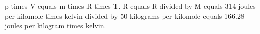 p times V equals m times R times T.  
R equals R divided by M equals 314 joules per kilomole times kelvin divided by 50 kilograms per kilomole equals 166.28 joules per kilogram times kelvin.